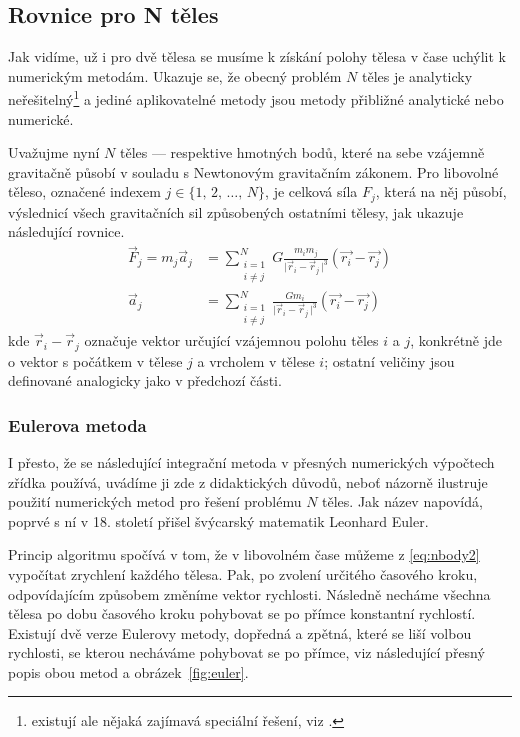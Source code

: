 \documentclass[A4paper, 12pt, oneside]{book}
\newcommand{\abs}[1]{\lvert #1 \,\rvert}
\begin{document}
\subsection{Rovnice pro N těles}
Jak vidíme, už i pro dvě tělesa se musíme k získání polohy tělesa v čase uchýlit k numerickým metodám. Ukazuje se, že obecný problém $N$ těles je analyticky neřešitelný\footnote{existují ale nějaká zajímavá speciální řešení, viz \cite{cohan12}.} a jediné aplikovatelné metody jsou metody přibližné analytické nebo numerické.

Uvažujme nyní $N$ těles --- respektive hmotných bodů, které na sebe vzájemně gravitačně působí v souladu s Newtonovým gravitačním zákonem. Pro libovolné těleso, označené indexem $j\in\{1,\,2,\,\dots,\,N\}$, je celková síla $F_j$, která na něj působí, výslednicí všech gravitačních sil způsobených ostatními tělesy, jak ukazuje následující rovnice.
\begin{align} 
	\vec{F}_j = m_j\vec{a}_j &= \sum_{\substack{i=1 \\ i\neq j}}^N G\frac{m_im_j}{\abs{\vec{r}_i-\vec{r}_j}^3}(\vec{r_i}-\vec{r_j}) \label{eq:nbody1}\\
		\vec{a}_j &= \sum_{\substack{i=1 \\ i\neq j}}^N \frac{Gm_i}{\abs{\vec{r}_i-\vec{r}_j}^3}(\vec{r_i}-\vec{r_j}) \label{eq:nbody2}
\end{align}
kde $\vec{r}_i-\vec{r}_j$ označuje vektor určující vzájemnou polohu těles $i$ a $j$, konkrétně jde o vektor s počátkem v tělese $j$ a vrcholem v tělese $i$; ostatní veličiny jsou definované analogicky jako v předchozí části.
\subsubsection{Eulerova metoda}
I přesto, že se následující integrační metoda v přesných numerických výpočtech zřídka používá, uvádíme ji zde z didaktických důvodů, neboť názorně ilustruje použití numerických metod pro řešení problému $N$ těles. Jak název napovídá, poprvé s ní v 18. století přišel švýcarský matematik Leonhard Euler.

Princip algoritmu spočívá v tom, že v libovolném čase můžeme z \eqref{eq:nbody2} vypočítat zrychlení každého tělesa. Pak, po zvolení určitého časového kroku, odpovídajícím způsobem změníme vektor rychlosti. Následně necháme všechna tělesa po dobu časového kroku pohybovat se po přímce konstantní rychlostí. Existují dvě verze Eulerovy metody, dopředná a zpětná, které se liší volbou rychlosti, se kterou necháváme pohybovat se po přímce, viz následující přesný popis obou metod a obrázek~\ref{fig:euler}.
\end{document}
